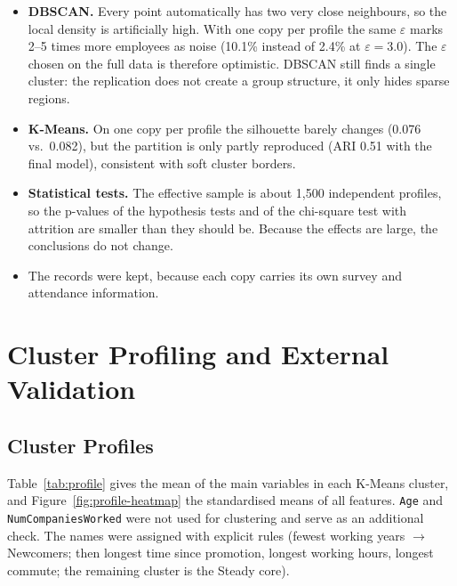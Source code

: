 \documentclass[12pt,a4paper]{article}
\begin{document}
\begin{itemize}
  \item \textbf{DBSCAN.} Every point automatically has two very close
  neighbours, so the local density is artificially high. With one copy per
  profile the same $\varepsilon$ marks 2--5 times more employees as noise
  (10.1\% instead of 2.4\% at $\varepsilon = 3.0$). The $\varepsilon$ chosen
  on the full data is therefore optimistic. DBSCAN still finds a single
  cluster: the replication does not create a group structure, it only hides
  sparse regions.
  \item \textbf{K-Means.} On one copy per profile the silhouette barely
  changes (0.076 vs.\ 0.082), but the partition is only partly reproduced
  (ARI 0.51 with the final model), consistent with soft cluster borders.
  \item \textbf{Statistical tests.} The effective sample is about 1,500
  independent profiles, so the p-values of the hypothesis tests and of the
  chi-square test with attrition are smaller than they should be. Because the
  effects are large, the conclusions do not change.
  \item The records were kept, because each copy carries its own survey and
  attendance information.
\end{itemize}

\section{Cluster Profiling and External Validation}
\label{sec:profiling}

\subsection{Cluster Profiles}

Table~\ref{tab:profile} gives the mean of the main variables in each K-Means
cluster, and Figure~\ref{fig:profile-heatmap} the standardised means of all
features. \texttt{Age} and \texttt{NumCompaniesWorked} were not used for
clustering and serve as an additional check. The names were assigned with
explicit rules (fewest working years $\rightarrow$ Newcomers; then longest
time since promotion, longest working hours, longest commute; the remaining
cluster is the Steady core).
\end{document}
